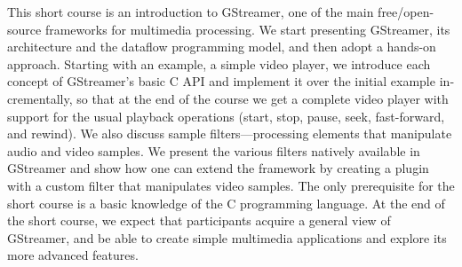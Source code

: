 \begin{otherlanguage}{english}
  This short course is an introduction to GStreamer, one of the main
  free/open-source frameworks for multimedia processing.  We start
  presenting GStreamer, its architecture and the dataflow programming
  model, and then adopt a hands-on approach.  Starting with an example, a
  simple video player, we introduce each concept of GStreamer’s basic C
  API and implement it over the initial example incrementally, so that at
  the end of the course we get a complete video player with support for
  the usual playback operations (start, stop, pause, seek, fast-forward,
  and rewind).  We also discuss sample filters---processing elements that
  manipulate audio and video samples.  We present the various filters
  natively available in GStreamer and show how one can extend the
  framework by creating a plugin with a custom filter that manipulates
  video samples.  The only prerequisite for the short course is a basic
  knowledge of the C programming language.  At the end of the short
  course, we expect that participants acquire a general view of GStreamer,
  and be able to create simple multimedia applications and explore its
  more advanced features.
\end{otherlanguage}
